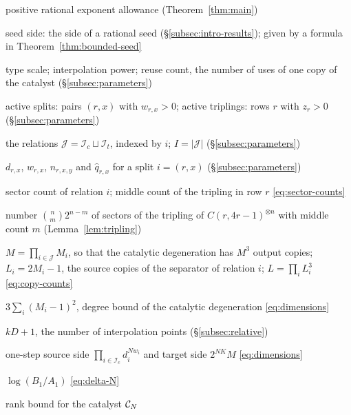 {\begin{list}{}{\setlength{\leftmargin}{0.22\textwidth}%
 \setlength{\labelwidth}{0.2\textwidth}\setlength{\labelsep}{0.02\textwidth}%
 \setlength{\itemsep}{1pt}\setlength{\parsep}{0pt}\setlength{\topsep}{0pt}%
 \renewcommand{\makelabel}[1]{#1\hfil}}
\item[\(\eps\)] positive rational exponent allowance
 (Theorem~\ref{thm:main})
\item[\(d_0\)] seed side: the side of a rational seed
 (\S\ref{subsec:intro-results}); given by a formula in
 Theorem~\ref{thm:bounded-seed}
\item[\(N\), \(k\), \(j\)] type scale; interpolation power; reuse count,
 the number of uses of one copy of the catalyst
 (\S\ref{subsec:parameters})
\item[\(\mathcal I_c\), \(\mathcal I_t\)] active splits: pairs \((r,x)\)
 with \(w_{r,x}>0\); active triplings: rows \(r\) with \(z_r>0\)
 (\S\ref{subsec:parameters})
\item[\(\mathcal J\), \(I\)] the relations
 \(\mathcal J=\mathcal I_c\sqcup\mathcal I_t\), indexed by \(i\);
 \(I=|\mathcal J|\) (\S\ref{subsec:parameters})
\item[\(d_i\), \(w_i\), \(n_{i,y}\), \(\hat q_i\)] \(d_{r,x}\),
 \(w_{r,x}\), \(n_{r,x,y}\) and \(\hat q_{r,x}\) for a split
 \(i=(r,x)\) (\S\ref{subsec:parameters})
\item[\(M_i\), \(m_r\)] sector count of relation \(i\); middle count of
 the tripling in row \(r\) \eqref{eq:sector-counts}
\item[\(M_{\mathrm t}(n,m)\)] number \(\binom nm2^{n-m}\) of sectors of
 the tripling of \(C(r,4r-1)^{\otimes n}\) with middle count \(m\)
 (Lemma~\ref{lem:tripling})
\item[\(M\), \(L_i\), \(L\)] \(M=\prod_{i\in\mathcal J}M_i\), so that
 the catalytic degeneration has \(M^3\) output copies; \(L_i=2M_i-1\),
 the source copies of the separator of relation \(i\);
 \(L=\prod_iL_i^3\) \eqref{eq:copy-counts}
\item[\(D\)] \(3\sum_i(M_i-1)^2\), degree bound of the catalytic
 degeneration \eqref{eq:dimensions}
\item[\(E\)] \(kD+1\), the number of interpolation points
 (\S\ref{subsec:relative})
\item[\(A_1\), \(B_1\)] one-step source side
 \(\prod_{i\in\mathcal I_c}d_i^{Nw_i}\) and target side \(2^{NK}M\)
 \eqref{eq:dimensions}
\item[\(\Delta_N\)] \(\log(B_1/A_1)\) \eqref{eq:delta-N}
\item[\(\kappa_N\)] rank bound for the catalyst \(\mathcal C_N\)

\end{list}}
